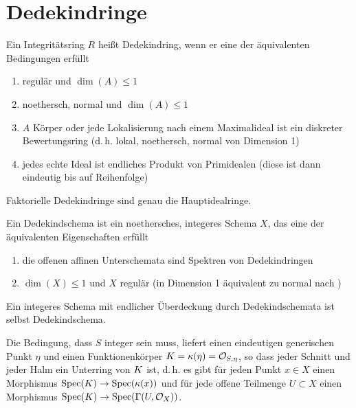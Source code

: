 \documentclass[german]{scrreprt}
\begin{document}
\section{Dedekindringe}
\begin{Definition}[Dedekindring]\label{def:dedekindring}
  Ein Integritätsring $R$ heißt Dedekindring, wenn er eine der
  äquivalenten Bedingungen erfüllt
  \begin{enumerate}[label=(\roman*)]
  \item regulär und $\dim(A)\leq 1$
  \item noethersch, normal und $\dim(A)\leq 1$
  \item $A$ Körper oder
    jede Lokalisierung nach einem Maximalideal ist ein diskreter
    Bewertungsring
    (d.\,h. lokal, noethersch, normal von Dimension 1)
  \item jedes echte Ideal ist endliches Produkt von Primidealen
    (diese ist dann eindeutig bis auf Reihenfolge) 
  \end{enumerate}

  Faktorielle Dedekindringe sind genau die Hauptidealringe.

  \begin{Definition}[Dedekindschema]
    Ein Dedekindschema ist ein noethersches, integeres Schema $X$, das
    eine der äquivalenten Eigenschaften erfüllt
    \begin{enumerate}[label=(\roman*)]
    \item die offenen affinen Unterschemata sind Spektren von Dedekindringen
    \item $\dim(X)\leq 1$ und $X$ regulär
      (in Dimension 1 äquivalent zu normal nach
      \cite[Corollary 6.39, Proposition 6.40]{wedhorn})
    \end{enumerate}
    Ein integeres Schema mit endlicher Überdeckung durch Dedekindschemata
    ist selbst Dedekindschema.
  \end{Definition}

  \begin{Bemerkung}
    Die Bedingung, dass $S$ integer sein muss, liefert einen eindeutigen
    generischen Punkt $\eta$ und einen Funktionenkörper
    $K=\kappa(\eta)=\mathcal{O}_{S,\eta}$, so dass jeder Schnitt und jeder Halm ein
    Unterring von $K$ ist, d.\,h. es gibt für jeden Punkt $x\in X$ einen
    Morphismus $\operatorname{Spec}(K)\to\operatorname{Spec}(\kappa(x))$ und für jede offene Teilmenge
    $U\subset X$ einen Morphismus $\operatorname{Spec}(K)\to\operatorname{Spec}(\Gamma(U,\mathcal{O}_X))$.


\end{Bemerkung}
\end{Definition}
\end{document}

